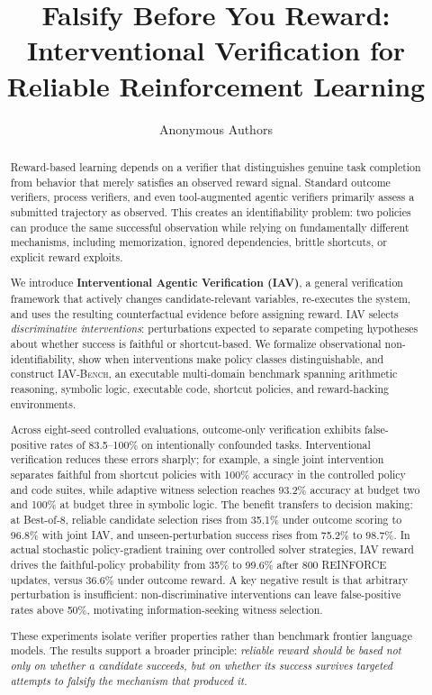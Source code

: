 \documentclass[10pt]{article}
\title{\textbf{Falsify Before You Reward:}\\
Interventional Verification for Reliable Reinforcement Learning}
\author{Anonymous Authors}
\date{}
\newcommand{\bench}{\textsc{IAV-Bench}}
\begin{document}
\maketitle

\begin{abstract}
Reward-based learning depends on a verifier that distinguishes genuine task completion from behavior that merely satisfies an observed reward signal. Standard outcome verifiers, process verifiers, and even tool-augmented agentic verifiers primarily assess a submitted trajectory as observed. This creates an identifiability problem: two policies can produce the same successful observation while relying on fundamentally different mechanisms, including memorization, ignored dependencies, brittle shortcuts, or explicit reward exploits.

We introduce \textbf{Interventional Agentic Verification (IAV)}, a general verification framework that actively changes candidate-relevant variables, re-executes the system, and uses the resulting counterfactual evidence before assigning reward. IAV selects \emph{discriminative interventions}: perturbations expected to separate competing hypotheses about whether success is faithful or shortcut-based. We formalize observational non-identifiability, show when interventions make policy classes distinguishable, and construct \bench{}, an executable multi-domain benchmark spanning arithmetic reasoning, symbolic logic, executable code, shortcut policies, and reward-hacking environments.

Across eight-seed controlled evaluations, outcome-only verification exhibits false-positive rates of 83.5--100\% on intentionally confounded tasks. Interventional verification reduces these errors sharply; for example, a single joint intervention separates faithful from shortcut policies with 100\% accuracy in the controlled policy and code suites, while adaptive witness selection reaches 93.2\% accuracy at budget two and 100\% at budget three in symbolic logic. The benefit transfers to decision making: at Best-of-8, reliable candidate selection rises from 35.1\% under outcome scoring to 96.8\% with joint IAV, and unseen-perturbation success rises from 75.2\% to 98.7\%. In actual stochastic policy-gradient training over controlled solver strategies, IAV reward drives the faithful-policy probability from 35\% to 99.6\% after 800 REINFORCE updates, versus 36.6\% under outcome reward. A key negative result is that arbitrary perturbation is insufficient: non-discriminative interventions can leave false-positive rates above 50\%, motivating information-seeking witness selection.

These experiments isolate verifier properties rather than benchmark frontier language models. The results support a broader principle: \emph{reliable reward should be based not only on whether a candidate succeeds, but on whether its success survives targeted attempts to falsify the mechanism that produced it.}
\end{abstract}
\end{document}
